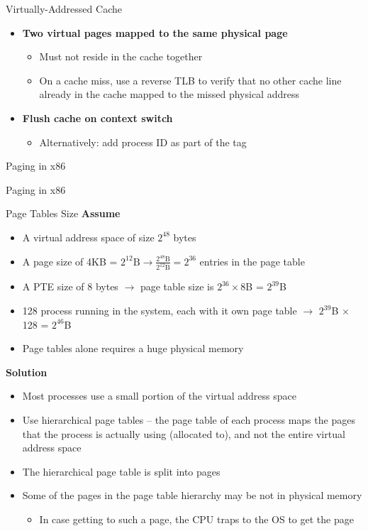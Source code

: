 \documentclass[aspectratio=169,12pt]{beamer}
\begin{document}
\begin{frame}{Virtually-Addressed Cache}
\vspace{0.3cm}
\begin{itemize}
\item \textbf{Two virtual pages mapped to the same physical page}
    \begin{itemize}
    \item Must not reside in the cache together
    \item On a cache miss, use a reverse TLB to verify that no other cache line already in the cache mapped to the missed physical address
    \end{itemize}
    
\item \textbf{Flush cache on context switch}
    \begin{itemize}
    \item Alternatively: add process ID as part of the tag
    \end{itemize}
\end{itemize}
\end{frame}

\begin{frame}{Paging in x86}
\begin{center}
\Huge Paging in x86
\end{center}
\end{frame}

\begin{frame}{Page Tables Size}
\textbf{Assume}
\begin{itemize}
\item A virtual address space of size $2^{48}$ bytes
\item A page size of 4KB = $2^{12}\text{B} \rightarrow \frac{2^{48}\text{B}}{2^{12}\text{B}} = 2^{36}$ entries in the page table
\item A PTE size of 8 bytes $\rightarrow$ page table size is $2^{36} \times 8$B = $2^{39}$B
\item 128 process running in the system, each with it own page table $\rightarrow$ $2^{39}$B $\times$ 128 = $2^{46}$B
\item Page tables alone requires a huge physical memory
\end{itemize}

\textbf{Solution}
\begin{itemize}
\item Most processes use a small portion of the virtual address space
\item Use hierarchical page tables – the page table of each process maps the pages that the process is actually using (allocated to), and not the entire virtual address space
\item The hierarchical page table is split into pages
\item Some of the pages in the page table hierarchy may be not in physical memory
    \begin{itemize}
    \item In case getting to such a page, the CPU traps to the OS to get the page
    \end{itemize}
\end{itemize}
\end{frame}
\end{document}
